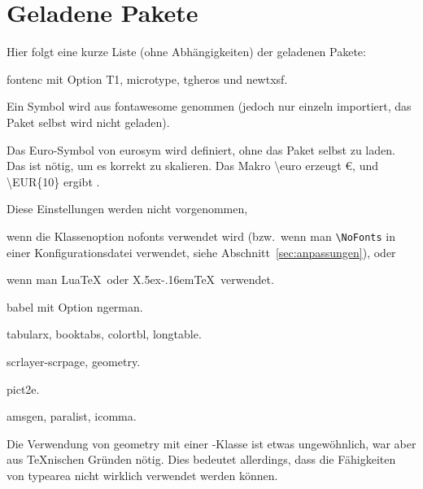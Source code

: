 \documentclass[hyperworksheet,pgfplots]{drcschool}
\newcommand*{\cs}[1]{\textup{\ttfamily\textbackslash#1}}                   %
\newcommand*{\pkg}[1]{\textup{\ttfamily#1}}                                %
\newcommand*{\opt}[1]{\textup{\ttfamily#1}}                                %
\begin{document}
\section{Geladene Pakete}
Hier folgt eine kurze Liste (ohne Abhängigkeiten) der geladenen Pakete:\par\medskip\noindent
\begin{compactdesc}
\item[Schriften] \pkg{fontenc} mit Option \opt{T1}, \pkg{microtype}, \pkg{tgheros} und \pkg{newtxsf}.

   Ein Symbol wird aus \pkg{fontawesome} genommen
   (jedoch nur einzeln importiert, das Paket selbst wird nicht geladen).

   Das Euro-Symbol von \pkg{eurosym} wird definiert, ohne das Paket selbst zu laden.
   Das ist nötig, um es korrekt zu skalieren. Das Makro \cs{euro} erzeugt \euro,
   und \cs{EUR\{10\}} ergibt .

   Diese Einstellungen werden nicht vorgenommen,
   \begin{compactitem}
   \item wenn die Klassenoption \opt{nofonts} verwendet wird (bzw.~wenn man
   \verb=\NoFonts= in einer Konfigurationsdatei verwendet, siehe
   Abschnitt~\ref{sec:anpassungen}), oder
   \item wenn man Lua\TeX\ oder X\lower.5ex\hbox{}\kern-.16em\TeX\
         verwendet.
   \end{compactitem}

\item[Sprache] \pkg{babel} mit Option \opt{ngerman}.
\item[Tabellen] \pkg{tabularx}, \pkg{booktabs}, \pkg{colortbl}, \pkg{longtable}.
\item[Seitenmanagement] \pkg{scrlayer-scrpage}, \pkg{geometry}.
\item[Grafik] \pkg{pict2e}.
\item[Verschiedenes] \pkg{amsgen},
   \pkg{paralist}, \pkg{icomma}.
\end{compactdesc}
Die Verwendung von \pkg{geometry} mit einer \KOMAScript-Klasse ist etwas
ungewöhnlich, war aber aus \TeX nischen Gründen nötig. Dies bedeutet allerdings,
dass die Fähigkeiten von \pkg{typearea} nicht wirklich verwendet werden können.
\end{document}
